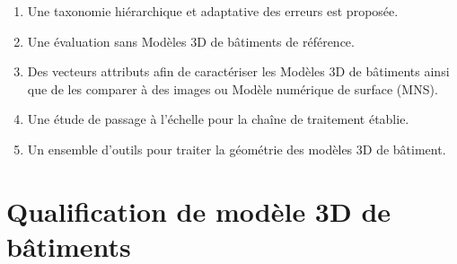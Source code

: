         \begin{enumerate}
            \item Une taxonomie hiérarchique et adaptative des erreurs est proposée.
            \item Une évaluation sans Modèles 3D de bâtiments de référence.
            \item Des vecteurs attributs afin de caractériser les Modèles 3D de bâtiments ainsi que de les comparer à des images ou Modèle numérique de surface (MNS).
            \item Une étude de passage à l'échelle pour la chaîne de traitement établie.
            \item Un ensemble d'outils pour traiter la géométrie des modèles 3D de bâtiment.
        \end{enumerate}

\section*{Qualification de modèle 3D de bâtiments}

